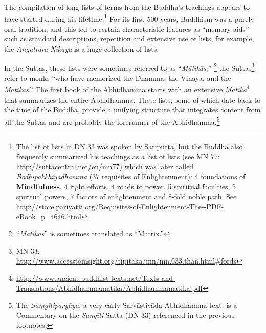 The compilation of long lists of terms from the Buddha’s teachings appears to have started during his lifetime.\footnote{The list of lists in DN 33 was spoken by Sāriputta, but the Buddha also frequently summarized his teachings as a list of lists (see MN 77: \url{http://suttacentral.net/en/mn77}) which was later called \textit{Bodhipakkhiyadhamma} (37 requisites of Enlightenment): 4 foundations of \textbf{Mindfulness}, 4 right efforts, 4 roads to power, 5 spiritual faculties, 5 spiritual powers, 7 factors of enlightenment and 8-fold noble path. See \url{http://store.pariyatti.org/Requisites-of-Enlightenment-The--PDF-eBook_p_4646.html}} For its first 500 years, Buddhism was a purely oral tradition, and this led to certain characteristic features as “memory aids” such as standard descriptions, repetition and extensive use of lists; for example, the \textit{Aṅguttara Nikāya} is a huge collection of lists. 

In the Suttas, these lists were sometimes referred to as “\textit{Mātikās};” \footnote{“\textit{Mātikās}” is sometimes translated as “Matrix.”} the Suttas\footnote{MN 33: \url{http://www.accesstoinsight.org/tipitaka/mn/mn.033.than.html\#fords}} refer to monks “who have memorized the Dhamma, the Vinaya, and the \textit{Mātikās}.” The first book of the Abhidhamma starts with an extensive \textit{Mātikā}\footnote{\url{http://www.ancient-buddhist-texts.net/Texts-and-Translations/Abhidhammamatika/Abhidhammamatika.pdf}} that summarizes the entire Abhidhamma. These lists, some of which date back to the time of the Buddha, provide a unifying structure that integrates content from all the Suttas and are probably the forerunner of the Abhidhamma.\footnote{The \textit{Saṃgītiparyāya}, a very early Sarvāstivāda Abhidhamma text, is a Commentary on the \textit{Sangīti} Sutta (DN 33) referenced in the previous footnotes.}

